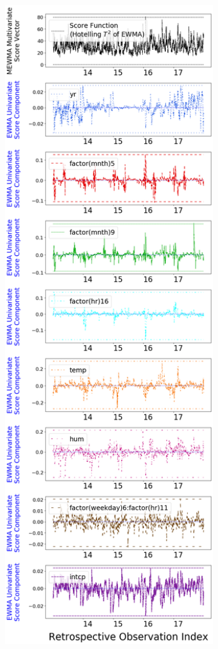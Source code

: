 \documentclass[twoside,11pt]{article}
\begin{document}
\begin{figure}[H]
\begin{subfigure}[t]{0.304\linewidth}
     \captionsetup{width=.95\linewidth}
     \caption{}
     \label{fig:bs_norm_retro}
\end{subfigure}
\begin{subfigure}[t]{0.304\linewidth}
     \centering
         \includegraphics[width=1.0\textwidth, trim=.0in .0in .0in .0in, clip]{../figures/v14/bike_sharing/reg_lin_C_2/quadr/PII_pos_single_retro_bike_fisher_mlines_with_regu_1e-08_0_0001_0_01_99_99.png}

\end{subfigure}
\end{figure}
\end{document}
